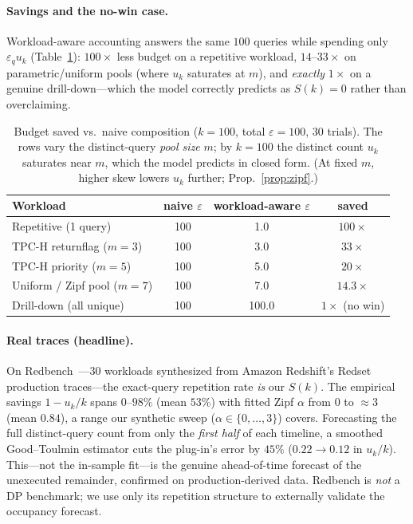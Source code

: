 \documentclass[runningheads]{llncs}
\newcommand{\eps}{\varepsilon}
\begin{document}
\paragraph{Savings and the no-win case.} Workload-aware accounting answers the same $100$ queries while spending only $\eps_q u_k$ (Table~\ref{tab:sav}): $100\times$ less budget on a repetitive workload, $14$--$33\times$ on parametric/uniform pools (where $u_k$ saturates at $m$), and \emph{exactly} $1\times$ on a genuine drill-down---which the model correctly predicts as $S(k){=}0$ rather than overclaiming.

\begin{table}[t]
\centering
\caption{Budget saved vs.\ naive composition ($k{=}100$, total $\eps{=}100$, $30$ trials). The rows vary the distinct-query \emph{pool size} $m$; by $k{=}100$ the distinct count $u_k$ saturates near $m$, which the model predicts in closed form. (At fixed $m$, higher skew lowers $u_k$ further; Prop.~\ref{prop:zipf}.)}
\label{tab:sav}
\setlength{\tabcolsep}{9pt}
\begin{tabular}{lccc}
\toprule
Workload & naive $\eps$ & workload-aware $\eps$ & saved \\
\midrule
Repetitive (1 query)            & 100 & 1.0  & $100\times$ \\
TPC-H returnflag ($m{=}3$)      & 100 & 3.0  & $33\times$ \\
TPC-H priority ($m{=}5$)        & 100 & 5.0  & $20\times$ \\
Uniform / Zipf pool ($m{=}7$)   & 100 & 7.0  & $14.3\times$ \\
Drill-down (all unique)         & 100 & 100.0 & $1\times$ (no win) \\
\bottomrule
\end{tabular}
\end{table}

\paragraph{Real traces (headline).} On Redbench~\cite{redbench2025}---$30$ workloads synthesized from Amazon Redshift's Redset production traces---the exact-query repetition rate \emph{is} our $S(k)$. The empirical savings $1-u_k/k$ spans $0$--$98\%$ (mean $53\%$) with fitted Zipf $\alpha$ from $0$ to ${\approx}3$ (mean $0.84$), a range our synthetic sweep ($\alpha\in\{0,\dots,3\}$) covers. Forecasting the full distinct-query count from only the \emph{first half} of each timeline, a smoothed Good--Toulmin estimator cuts the plug-in's error by $45\%$ ($0.22\!\to\!0.12$ in $u_k/k$). This---not the in-sample fit---is the genuine ahead-of-time forecast of the unexecuted remainder, confirmed on production-derived data. Redbench is \emph{not} a DP benchmark; we use only its repetition structure to externally validate the occupancy forecast.
\end{document}
